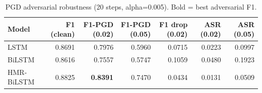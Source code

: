 \begin{table}[h!]
\centering
\caption{PGD adversarial robustness (20 steps, alpha=0.005). Bold = best adversarial F1.}
\label{tab:pgd_robust}
\begin{tabular}{lrrrrrr}
\toprule
Model & F1 (clean) & F1-PGD (0.02) & F1-PGD (0.05) & F1 drop (0.02) & ASR (0.02) & ASR (0.05) \\
\midrule
LSTM & 0.8691 & 0.7976 & 0.5960 & 0.0715 & 0.0223 & 0.0997 \\
BiLSTM & 0.8616 & 0.7557 & 0.5747 & 0.1059 & 0.0480 & 0.1923 \\
HMR-BiLSTM & 0.8825 & \textbf{0.8391} & 0.7470 & 0.0434 & 0.0131 & 0.0509 \\
\bottomrule
\end{tabular}
\end{table}